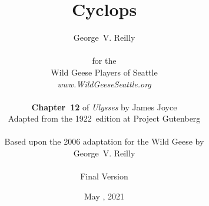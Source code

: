 


\title{\Huge Cyclops}
\author{George~V. Reilly\\
\\
{\small for the}\\
Wild Geese Players of Seattle\\
{\textit{www.WildGeeseSeattle.org}}\\
\\
{\small \textbf{Chapter~12} of \textit{Ulysses} by James Joyce}\\
{\small Adapted from the 1922~edition at Project Gutenberg}
\\
\\
{\small Based upon the 2006 adaptation for the Wild Geese by}\\
{\small George~V. Reilly}\\
\\
{\small Final Version}}
\date{May , 2021}
\raggedbottom



\maketitle
\thispagestyle{empty}

\newpage
\thispagestyle{empty}

